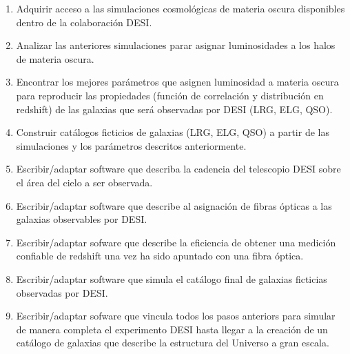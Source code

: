 \begin{enumerate}
\item Adquirir acceso a las simulaciones cosmol\'ogicas de materia
  oscura disponibles dentro de la colaboraci\'on DESI.

\item Analizar las anteriores simulaciones parar asignar luminosidades
  a los halos de materia oscura.

\item Encontrar los mejores par\'ametros que asignen luminosidad a
  materia oscura para reproducir las propiedades (funci\'on de
  correlaci\'on y distribuci\'on en redshift) de las galaxias que
  ser\'a observadas por DESI (LRG, ELG, QSO).

\item Construir cat\'alogos ficticios de galaxias (LRG, ELG, QSO) a
  partir de las simulaciones y los par\'ametros descritos
  anteriormente.

\item Escribir/adaptar software que describa la cadencia del
  telescopio DESI sobre el \'area del cielo a ser observada.

\item Escribir/adaptar software que describe al asignaci\'on de fibras
  \'opticas a las galaxias observables por DESI.

\item Escribir/adaptar sofware que describe la eficiencia de obtener
  una medici\'on confiable de redshift una vez ha sido apuntado con
  una fibra \'optica.

\item Escribir/adaptar software que simula el cat\'alogo final de
  galaxias ficticias observadas por DESI.

\item Escribir/adaptar sofware que vincula todos los pasos anteriors
  para simular de manera completa el experimento DESI hasta llegar a
  la creaci\'on de un cat\'alogo de galaxias que describe la
  estructura del Universo a gran escala.
\end{enumerate}


